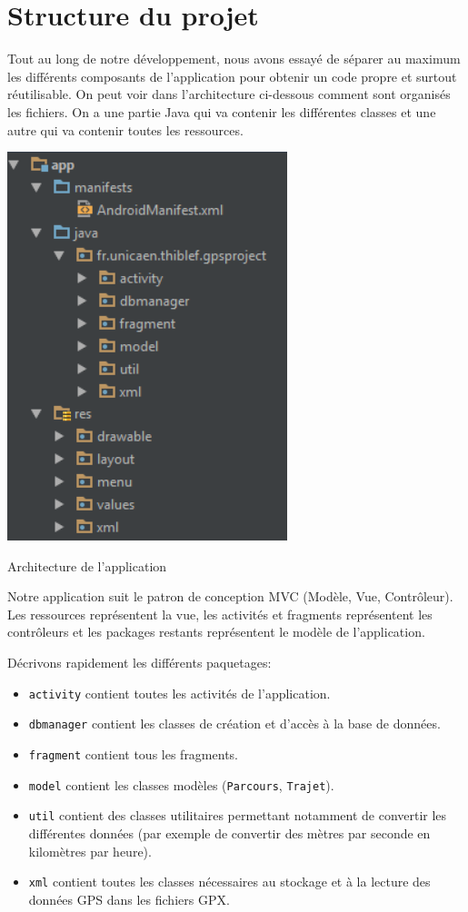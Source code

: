 \section{Structure du projet}

Tout au long de notre développement, nous avons essayé de séparer au maximum les différents composants de l'application pour obtenir un code propre et surtout réutilisable. On peut voir dans l'architecture ci-dessous comment sont organisés les fichiers. On a une partie Java qui va contenir les différentes classes et une autre qui va contenir toutes les ressources.\bigskip

\begin{img}
  \includegraphics[scale=0.45]{img/archi.png}
  \caption{Architecture de l'application}
\end{img}

Notre application suit le patron de conception MVC (Modèle, Vue, Contrôleur). Les ressources représentent la vue, les activités et fragments représentent les contrôleurs et les packages restants représentent le modèle de l'application.\bigskip

Décrivons rapidement les différents paquetages:\bigskip

\begin{itemize}
 	\item \verb!activity! contient toutes les activités de l'application.
 	\item \verb!dbmanager! contient les classes de création et d'accès à la base de données.
 	\item \verb!fragment! contient tous les fragments.
 	\item \verb!model! contient les classes modèles (\verb!Parcours!, \verb!Trajet!).
 	\item \verb!util! contient des classes utilitaires permettant notamment de convertir les différentes données (par exemple de convertir des mètres par seconde en kilomètres par heure).
 	\item \verb!xml! contient toutes les classes nécessaires au stockage et à la lecture des données GPS dans les fichiers GPX.
\end{itemize}\bigskip
 



